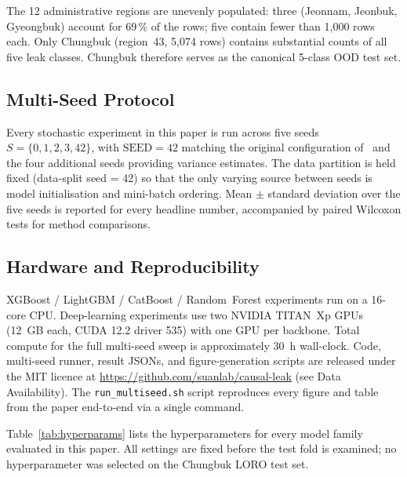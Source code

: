 \documentclass[3p,times,authoryear]{elsarticle}
\theoremstyle{remark}
\begin{document}
The 12 administrative regions are unevenly populated: three
(Jeonnam, Jeonbuk, Gyeongbuk) account for 69\,\% of the rows;
five contain fewer than 1{,}000 rows each. Only Chungbuk
(region~43, 5{,}074 rows) contains substantial counts of all
five leak classes. Chungbuk therefore serves as the canonical
5-class OOD test set.

\subsection{Multi-Seed Protocol}

Every stochastic experiment in this paper is run across five
seeds $S = \{0, 1, 2, 3, 42\}$, with $\mathrm{SEED} = 42$
matching the original configuration of~\cite{lee2023leak} and
the four additional seeds providing variance estimates. The
data partition is held fixed (data-split seed = 42) so that the
only varying source between seeds is model initialisation and
mini-batch ordering. Mean $\pm$ standard deviation over the
five seeds is reported for every headline number, accompanied
by paired Wilcoxon tests for method comparisons.

\subsection{Hardware and Reproducibility}

XGBoost / LightGBM / CatBoost / Random~Forest experiments run
on a 16-core CPU. Deep-learning experiments use two NVIDIA
TITAN~Xp GPUs (12~GB each, CUDA 12.2 driver 535) with one GPU
per backbone. Total compute for the full multi-seed sweep is
approximately 30~h wall-clock. Code, multi-seed runner,
result JSONs, and figure-generation scripts are released under
the MIT licence at \url{https://github.com/suanlab/causal-leak}
(see Data Availability). The
\texttt{run\_multiseed.sh} script reproduces every figure and
table from the paper end-to-end via a single command.

Table~\ref{tab:hyperparams} lists the hyperparameters for every
model family evaluated in this paper. All settings are fixed
before the test fold is examined; no hyperparameter was selected
on the Chungbuk LORO test set.
\end{document}

